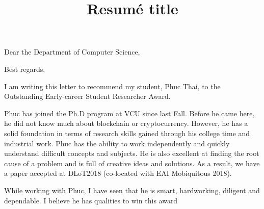 \documentclass[18pt,a4paper,sans]{moderncv}        %
\title{Resumé title}                               %
\begin{document}
\opening{Dear the Department of Computer Science,}
\closing{Best regards,}

\makelettertitle

I am writing this letter to recommend my student, Phuc Thai, to the Outstanding Early-career Student Researcher Award. 

Phuc has joined the Ph.D program at VCU since last Fall. Before he came here, he did not know much about blockchain or cryptocurrency. However, he has a solid foundation in terms of research skills gained through his college time and industrial work. Phuc has the ability to work independently and quickly understand difficult concepts and subjects. He is also excellent at finding the root cause of a problem and is full of creative ideas and solutions. As a result, we have a paper accepted at DLoT2018 (co-located with EAI Mobiquitous 2018). 

While working with Phuc, I have seen that he is smart, hardworking, diligent and dependable. I believe he has qualities to win this award

\makeletterclosing
\end{document}

